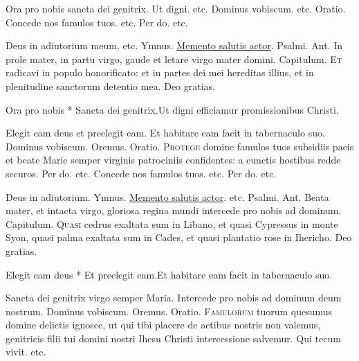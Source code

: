 \begin{multicols*}{2}
\begin{responsory-breve}
\end{responsory-breve}
\V Ora pro nobis sancta dei genitrix. \R Ut digni. etc. Dominus vobiscum. etc. {\color{Red} Oratio.}
{\zallmancaps \color{Red} C}{oncede} nos famulos tuos. etc. Per do. etc.
{\color{Red} }
\par \noindent Deus in adiutorium meum. etc. {\color{Red} Ymnus.} \hyperlink{memento-salutis}{{\zallmancaps \color{Red} M}emento salutis actor}. {\color{Red} Psalmi.}
{\color{Red} Ant.} In prole mater, in partu virgo, gaude et letare virgo mater domini. {\color{Red} Capitulum.}
\lettrine[lines=2]{\zallmancaps \color{Red} E}{t} radicavi in populo honorificato: et in partes dei mei hereditas illius, et in plenitudine sanctorum detentio mea. Deo gratias.
\begin{responsory-breve}
{Ora pro nobis * Sancta dei genitrix.}{Ut digni efficiamur promissionibus Christi.}
\end{responsory-breve}
\V Elegit eam deus et preelegit eam. \R Et habitare eam facit in tabernaculo suo. Dominus vobiscum. Oremus. {\color{Red} Oratio.}
\lettrine[lines=2]{\zallmancaps \color{Blue} P}{rotege} domine famulos tuos subsidiis pacis et beate Marie semper virginis patrociniis confidentes: a cunctis hostibus redde securos. Per do. etc.
{\zallmancaps \color{Red} C}{oncede} nos famulos tuos. etc. Per do. etc.
{\color{Red} }
\par \noindent Deus in adiutorium. {\color{Red} Ymnus.} \hyperlink{memento-salutis}{{\zallmancaps \color{Red} M}emento salutis actor}. etc. {\color{Red} Psalmi.}
{\color{Red} Ant.} Beata mater, et intacta virgo, gloriosa regina mundi intercede pro nobis ad dominum. {\color{Red} Capitulum.}
\lettrine[lines=2]{\zallmancaps \color{Red} Q}{uasi} cedrus exaltata sum in Libano, et quasi Cypressus in monte Syon, quasi palma exaltata sum in Cades, et quasi plantatio rose in Ihericho. Deo gratias.
\begin{responsory-breve}
{Elegit eam deus * Et preelegit eam.}{Et habitare eam facit in tabernaculo suo.}
\end{responsory-breve}
\V Sancta dei genitrix virgo semper Maria. \R Intercede pro nobis ad dominum deum nostrum. Dominus vobiscum. {\color{Red} Oremus. Oratio.}
\lettrine[lines=2]{\zallmancaps \color{Blue} F}{amulorum} tuorum quesumus domine delictis ignosce, ut qui tibi placere de actibus nostris non valemus, genitricis filii tui domini nostri Ihesu Christi intercessione salvemur. Qui tecum vivit. etc.

\end{multicols*}
